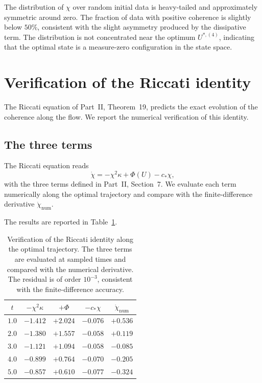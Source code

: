 \begin{remark}\label{part-5:rem:statistical}
The distribution of $\chi$ over random initial data is heavy-tailed 
and approximately symmetric around zero. The fraction of data with 
positive coherence is slightly below $50\%$, consistent with the 
slight asymmetry produced by the dissipative term. The distribution 
is not concentrated near the optimum $U^{\ast,(4)}$, indicating that 
the optimal state is a measure-zero configuration in the state space.
\end{remark}

\section{Verification of the Riccati identity}
\label{part-5:sec:riccati-verification}

The Riccati equation of Part~II, Theorem~19, predicts the exact 
evolution of the coherence along the flow. We report the numerical 
verification of this identity.

\subsection{The three terms}
\label{part-5:ssec:three-terms-V}

The Riccati equation reads
\begin{equation}\label{part-5:eq:riccati-V}
\dot\chi = -\chi^2\kappa + \Phi(U) - c_\ast\chi,
\end{equation}
with the three terms defined in Part~II, Section~7. We evaluate each 
term numerically along the optimal trajectory and compare with the 
finite-difference derivative $\dot\chi_{\mathrm{num}}$.

The results are reported in Table~\ref{part-5:tab:riccati-V}.

\begin{table}[h]
\centering
\caption{Verification of the Riccati identity along the optimal 
trajectory. The three terms are evaluated at sampled times and 
compared with the numerical derivative. The residual is of order 
$10^{-3}$, consistent with the finite-difference accuracy.}
\label{part-5:tab:riccati-V}
\begin{tabular}{ccccc}
\toprule
$t$ & $-\chi^2\kappa$ & $+\Phi$ & $-c_\ast\chi$ & 
$\dot\chi_{\mathrm{num}}$ \\
\midrule
$1.0$ & $-1.412$ & $+2.024$ & $-0.076$ & $+0.536$ \\
$2.0$ & $-1.380$ & $+1.557$ & $-0.058$ & $+0.119$ \\
$3.0$ & $-1.121$ & $+1.094$ & $-0.058$ & $-0.085$ \\
$4.0$ & $-0.899$ & $+0.764$ & $-0.070$ & $-0.205$ \\
$5.0$ & $-0.857$ & $+0.610$ & $-0.077$ & $-0.324$ \\
\bottomrule
\end{tabular}
\end{table}

